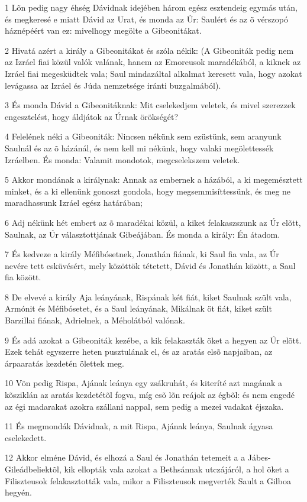 \par 1 Lõn pedig nagy éhség Dávidnak idejében három egész esztendeig egymás után, és megkeresé e miatt Dávid az Urat, és monda az Úr: Saulért és az õ vérszopó háznépéért van ez: mivelhogy megölte a  Gibeonitákat.
\par 2 Hivatá azért a király a Gibeonitákat és szóla nékik: (A Gibeoniták pedig nem az Izráel fiai közül valók valának, hanem az Emoreusok maradékából, a kiknek az Izráel fiai megesküdtek vala; Saul mindazáltal alkalmat keresett vala, hogy azokat levágassa az Izráel és Júda nemzetsége iránti buzgalmából).
\par 3 És monda Dávid a Gibeonitáknak: Mit cselekedjem veletek, és mivel szerezzek engesztelést, hogy áldjátok az Úrnak örökségét?
\par 4 Felelének néki a Gibeoniták: Nincsen nékünk sem ezüstünk, sem aranyunk Saulnál és az õ házánál, és nem kell mi nékünk, hogy valaki megölettessék Izráelben. És monda: Valamit mondotok, megcselekszem veletek.
\par 5 Akkor mondának a királynak: Annak az embernek a házából, a ki megemésztett minket, és a ki ellenünk gonoszt gondola, hogy megsemmisíttessünk, és meg ne maradhassunk Izráel egész határában;
\par 6 Adj nékünk hét embert az õ maradékai közül, a kiket felakaszszunk az Úr elõtt, Saulnak, az Úr választottjának Gibeájában. És monda a király: Én átadom.
\par 7 És kedveze a király Méfibósetnek, Jonathán fiának, ki Saul fia vala, az Úr nevére tett esküvésért, mely közöttök tétetett, Dávid és Jonathán között, a Saul fia között.
\par 8 De elvevé a király Aja leányának, Rispának két fiát, kiket Saulnak szült vala, Armónit és Méfibósetet, és a Saul leányának, Mikálnak öt fiát, kiket szült Barzillai fiának,  Adrielnek, a Méholátból valónak.
\par 9 És adá azokat a Gibeoniták kezébe, a kik felakaszták õket a hegyen az Úr elõtt. Ezek tehát egyszerre heten pusztulának el, és az aratás elsõ napjaiban, az árpaaratás kezdetén ölettek meg.
\par 10 Võn pedig Rispa, Ajának leánya egy zsákruhát, és kiteríté azt magának a kõsziklán az aratás kezdetétõl fogva, míg esõ lõn reájok az égbõl: és nem engedé az égi madarakat azokra szállani nappal, sem pedig a mezei vadakat éjszaka.
\par 11 És megmondák Dávidnak, a mit Rispa, Ajának leánya, Saulnak ágyasa cselekedett.
\par 12 Akkor elméne Dávid, és elhozá a Saul és Jonathán tetemeit a a Jábes-Gileádbeliektõl, kik ellopták vala azokat a Bethsánnak utczájáról, a hol õket a Filiszteusok felakasztották vala, mikor a Filiszteusok megverték Sault a Gilboa hegyén.
